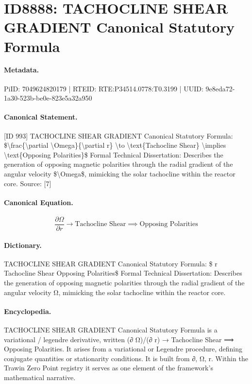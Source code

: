 \section*{ID8888: TACHOCLINE SHEAR GRADIENT Canonical Statutory Formula}
\paragraph{Metadata.}
PiID: 7049624820179 | RTEID: RTE:P34514.0778:T0.3199 | UUID: 9e8eda72-1a30-523b-be0e-823e5a32a950

\paragraph{Canonical Statement.}
[ID 993] TACHOCLINE SHEAR GRADIENT Canonical Statutory Formula: \$\textbackslash{}frac\{\textbackslash{}partial \textbackslash{}Omega\}\{\textbackslash{}partial r\} \textbackslash{}to \textbackslash{}text\{Tachocline Shear\} \textbackslash{}implies \textbackslash{}text\{Opposing Polarities\}\$ Formal Technical Dissertation: Describes the generation of opposing magnetic polarities through the radial gradient of the angular velocity \$\textbackslash{}Omega\$, mimicking the solar tachocline within the reactor core. Source: [7]

\paragraph{Canonical Equation.}
\[
\frac{\partial \Omega}{\partial r} \to \text{Tachocline Shear} \implies \text{Opposing Polarities}
\]

\paragraph{Dictionary.}
TACHOCLINE SHEAR GRADIENT Canonical Statutory Formula: \$ r Tachocline Shear Opposing Polarities\$ Formal Technical Dissertation: Describes the generation of opposing magnetic polarities through the radial gradient of the angular velocity Ω, mimicking the solar tachocline within the reactor core.

\paragraph{Encyclopedia.}
TACHOCLINE SHEAR GRADIENT Canonical Statutory Formula is a variational / legendre derivative, written (∂ Ω)/(∂ r) → Tachocline Shear ⟹ Opposing Polarities. It arises from a variational or Legendre procedure, defining conjugate quantities or stationarity conditions. It is built from ∂, Ω, r. Within the Trawin Zero Point registry it serves as one element of the framework's mathematical narrative.

